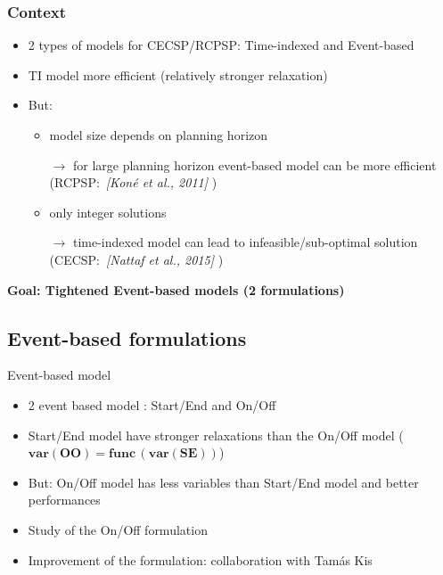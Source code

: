 
\begin{frame}
  \frametitle{Context}
  \begin{itemize}
  \item 2 types of models for CECSP/RCPSP: Time-indexed and Event-based
    \vfill
    \pause
  \item TI model more efficient {\small (relatively stronger relaxation)}
    \pause
    \vfill
  \item But:
    \begin{itemize}
    \item  model size depends on planning horizon 
      
      {\footnotesize  $\longrightarrow $ for large planning horizon event-based model can be more
        efficient (RCPSP:~{\color{gray!50!black!70}\it [Koné et al.,
          2011]} )}
      \vfill
      \pause
    \item only integer solutions
      
      {\footnotesize $\longrightarrow$ time-indexed model can lead to
        infeasible/sub-optimal solution
        (CECSP:~{\color{gray!50!black!70}\it [Nattaf et al., 2015]} )}
    \end{itemize}
  \end{itemize}
  \vfill
  \pause
  {\bf Goal: Tightened Event-based models (2 formulations)} 
\end{frame}

\subsection{Event-based formulations}
\begin{frame}{Event-based model}
  \vfill
  \begin{itemize}
  \item 2 event based model : Start/End and On/Off
    \vfill
    \pause
  \item Start/End model have stronger relaxations than the On/Off
    model ( $\mathbf{var(OO) = func\, (var (SE))}$)
    \pause
    \vfill
  \item But: On/Off model has less variables than Start/End model
    \pause
    and  better performances  
    \vfill
    \pause
  \item Study of the On/Off formulation
    \vfill
    \pause
  \item Improvement of the formulation: collaboration with Tam{\'a}s Kis 
  \end{itemize} 
  \vfill
\end{frame}

